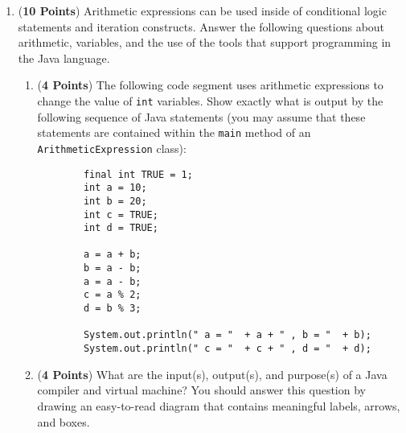 \documentclass[12pt]{article}
\begin{document}
\begin{enumerate}

\item ({\bf 10 Points}) Arithmetic expressions can be used inside of conditional logic statements and iteration
  constructs.  Answer the following questions about arithmetic, variables, and the use of the tools that support
  programming in the Java language.

\begin{enumerate}

\item ({\bf 4 Points}) The following code segment uses arithmetic expressions to change the value of {\tt int}
  variables.  Show exactly what is output by the following sequence of Java statements (you may assume that these
  statements are contained within the {\tt main} method of an {\tt ArithmeticExpression} class):

  \begin{verbatim}
        final int TRUE = 1;
        int a = 10;
        int b = 20;
        int c = TRUE;
        int d = TRUE;
        
        a = a + b;
        b = a - b;
        a = a - b;
        c = a % 2;
        d = b % 3;
        
        System.out.println(" a = "  + a + " , b = "  + b);
        System.out.println(" c = "  + c + " , d = "  + d);
  \end{verbatim}
  \vspace*{-.2in}

\item ({\bf 4 Points}) What are the input(s), output(s), and purpose(s) of a Java compiler and virtual machine?  You
  should answer this question by drawing an easy-to-read diagram that contains meaningful labels, arrows, and boxes.




\end{enumerate}
\end{enumerate}
\end{document}
